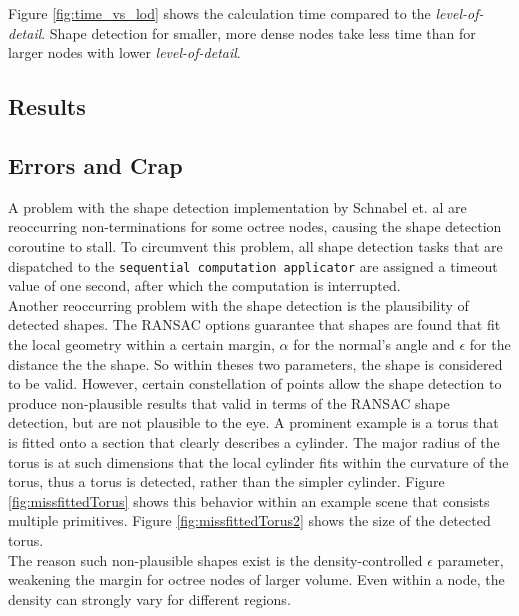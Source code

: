 Figure \ref{fig:time_vs_lod} shows the calculation time compared to the \textit{level-of-detail}. Shape detection for smaller, more dense nodes take less time than for larger nodes with lower \textit{level-of-detail}. 
\subsection{Results}


\subsection{Errors and Crap \todo{}}

A problem with the shape detection implementation by Schnabel et. al\cite{schnabel-2007-software} are reoccurring non-terminations for some octree nodes, causing the shape detection coroutine to stall. To circumvent this problem, all shape detection tasks that are dispatched to the \verb|sequential computation applicator| are assigned a timeout value of one second, after which the computation is interrupted. 
\\
Another reoccurring problem with the shape detection is the plausibility of detected shapes. The RANSAC options guarantee that shapes are found that fit the local geometry within a certain margin, $\alpha$ for the normal's angle and $\epsilon$ for the distance the the shape. So within theses two parameters, the shape is considered to be valid. However, certain constellation of points allow the shape detection to produce non-plausible results that valid in terms of the RANSAC shape detection, but are not plausible to the eye. A prominent example is a torus that is fitted onto a section that clearly describes a cylinder. The major radius of the torus is at such dimensions that the local cylinder fits within the curvature of the torus, thus a torus is detected, rather than the simpler cylinder. Figure \ref{fig:missfittedTorus} shows this behavior within an example scene that consists multiple primitives. Figure \ref{fig:missfittedTorus2} shows the size of the detected torus. 
\\
The reason such non-plausible shapes exist is the density-controlled $\epsilon$ parameter, weakening the margin for octree nodes of larger volume. Even within a node, the density can strongly vary for different regions. 

